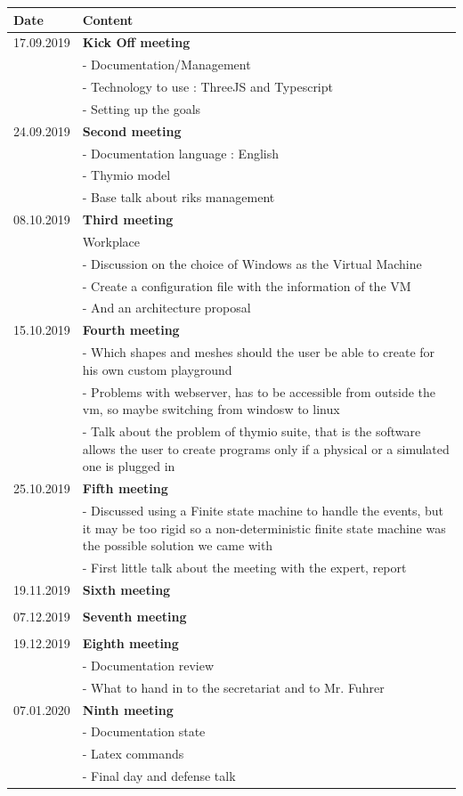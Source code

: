 \documentclass{scrbook}
\begin{document}
\begin{tabular}{ | m{3cm} | m{10cm} | }
  \hline
  Date & Content \\
  \hline
  17.09.2019 & \textbf{Kick Off meeting}\\
  & - Documentation/Management\\
  & - Technology to use : ThreeJS and Typescript\\
  & - Setting up the goals\\
  \hline
  24.09.2019 & \textbf{Second meeting} \\
  & - Documentation language : English \\
  & - Thymio model \\
  & - Base talk about riks management \\
  \hline
  08.10.2019 & \textbf{Third meeting}\\
  & Workplace\\
  & - Discussion on the choice of Windows as the Virtual Machine \\
  & - Create a configuration file with the information of the VM \\
  & - And an architecture proposal \\
  \hline
  15.10.2019 & \textbf{Fourth meeting} \\
  & - Which shapes and meshes should the user be able to create for his own custom playground \\
  & - Problems with webserver, has to be accessible from outside the vm, so maybe switching from windosw to linux \\
  & - Talk about the problem of thymio suite, that is the software allows the user to create programs only if a physical or a simulated one is plugged in \\
  \hline
  25.10.2019 & \textbf{Fifth meeting} \\
  & - Discussed using a Finite state machine to handle the events, but it may be too rigid so a non-deterministic finite state machine was the possible solution we came with \\
  & - First little talk about the meeting with the expert, report\\
  \hline
  19.11.2019 & \textbf{Sixth meeting} \\
  & \\
  \hline
  07.12.2019 & \textbf{Seventh meeting} \\
  & \\
  \hline
  19.12.2019 & \textbf{Eighth meeting} \\
  & - Documentation review\\
  & - What to hand in to the secretariat and to Mr. Fuhrer\\
  \hline
  07.01.2020 & \textbf{Ninth meeting} \\
  & - Documentation state\\
  & - Latex commands\\
  & - Final day and defense talk\\
  \hline
\end{tabular}
\end{document}
